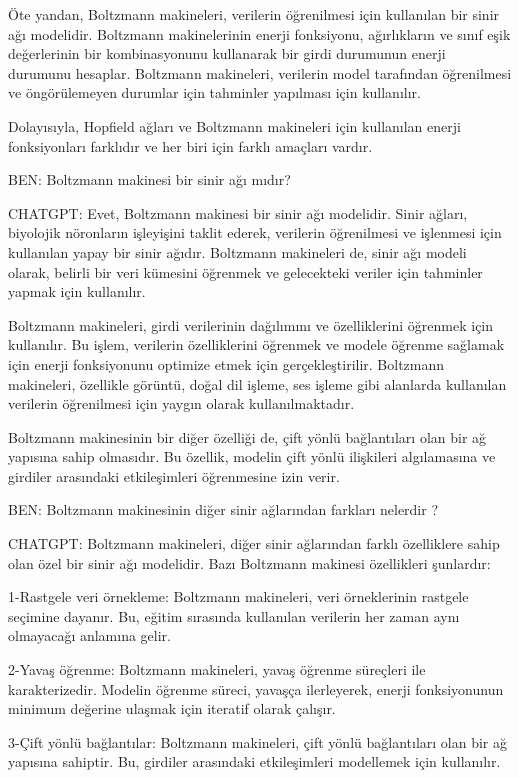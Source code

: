 \documentclass[11pt]{article}
\begin{document}
Öte yandan, Boltzmann makineleri, verilerin öğrenilmesi için kullanılan bir sinir ağı modelidir. Boltzmann makinelerinin enerji fonksiyonu, ağırlıkların ve sınıf eşik değerlerinin bir kombinasyonunu kullanarak bir girdi durumunun enerji durumunu hesaplar. Boltzmann makineleri, verilerin model tarafından öğrenilmesi ve öngörülemeyen durumlar için tahminler yapılması için kullanılır.

Dolayısıyla, Hopfield ağları ve Boltzmann makineleri için kullanılan enerji fonksiyonları farklıdır ve her biri için farklı amaçları vardır.

BEN: Boltzmann makinesi bir sinir ağı mıdır?

CHATGPT: Evet, Boltzmann makinesi bir sinir ağı modelidir. Sinir ağları, biyolojik nöronların işleyişini taklit ederek, verilerin öğrenilmesi ve işlenmesi için kullanılan yapay bir sinir ağıdır. Boltzmann makineleri de, sinir ağı modeli olarak, belirli bir veri kümesini öğrenmek ve gelecekteki veriler için tahminler yapmak için kullanılır.

Boltzmann makineleri, girdi verilerinin dağılımını ve özelliklerini öğrenmek için kullanılır. Bu işlem, verilerin özelliklerini öğrenmek ve modele öğrenme sağlamak için enerji fonksiyonunu optimize etmek için gerçekleştirilir. Boltzmann makineleri, özellikle görüntü, doğal dil işleme, ses işleme gibi alanlarda kullanılan verilerin öğrenilmesi için yaygın olarak kullanılmaktadır.

Boltzmann makinesinin bir diğer özelliği de, çift yönlü bağlantıları olan bir ağ yapısına sahip olmasıdır. Bu özellik, modelin çift yönlü ilişkileri algılamasına ve girdiler arasındaki etkileşimleri öğrenmesine izin verir.

BEN: Boltzmann makinesinin diğer sinir ağlarından farkları nelerdir ?

CHATGPT: Boltzmann makineleri, diğer sinir ağlarından farklı özelliklere sahip olan özel bir sinir ağı modelidir. Bazı Boltzmann makinesi özellikleri şunlardır:

1-Rastgele veri örnekleme: Boltzmann makineleri, veri örneklerinin rastgele seçimine dayanır. Bu, eğitim sırasında kullanılan verilerin her zaman aynı olmayacağı anlamına gelir.

2-Yavaş öğrenme: Boltzmann makineleri, yavaş öğrenme süreçleri ile karakterizedir. Modelin öğrenme süreci, yavaşça ilerleyerek, enerji fonksiyonunun minimum değerine ulaşmak için iteratif olarak çalışır.

3-Çift yönlü bağlantılar: Boltzmann makineleri, çift yönlü bağlantıları olan bir ağ yapısına sahiptir. Bu, girdiler arasındaki etkileşimleri modellemek için kullanılır.
\end{document}
